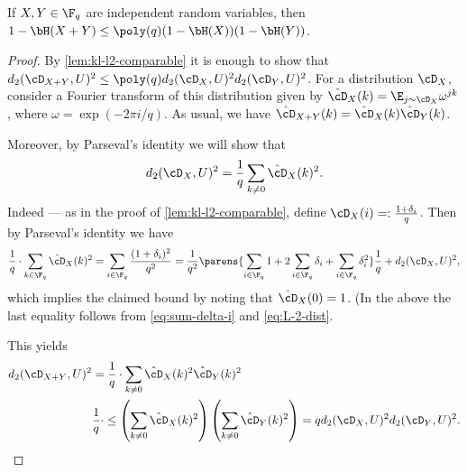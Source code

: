 \documentclass[11pt]{article}
\begin{document}
\begin{lemma}
	\label{lem:entropy-unconditional}
	If $X, Y \in \F_q$ are independent random variables, then $1 - \bH(X + Y) \leq \poly(q) (1 - \bH(X))(1 - \bH(Y))$.
\end{lemma}
\begin{proof}
	By \cref{lem:kl-l2-comparable} it is enough to show that $d_2(\cD_{X+Y}, U)^2 \leq \poly(q) d_2(\cD_X, U)^2 d_2(\cD_Y, U)^2$.
	For a distribution $\cD_X$, consider a Fourier transform of this distribution given by $\hat{\cD}_X(k) = \E_{j \sim \cD_X} \omega^{jk}$, where $\omega = \exp(-2 \pi i/q)$. As usual, we have $\hat{\cD}_{X+Y}(k) = \hat{\cD}_X(k) \hat{\cD}_Y(k)$.
	
	Moreover, by Parseval's identity we will show that 
	\[d_2(\cD_X, U)^2  = \frac{1}{q}\sum_{k \not= 0} \hat{\cD}_X(k)^2.\] 
	Indeed --- as in the proof of \cref{lem:kl-l2-comparable}, define $\cD_X(i) =:  \frac{1 + \delta_i}{q}$. Then by Parseval's identity we have
	\[\frac{1}{q}\cdot\sum_{k\in\F_q} \hat{\cD}_X(k)^2 = \sum_{i\in\F_q} \frac{(1+\delta_i)^2}{q^2} =\frac 1{q^2}\parens{\sum_{i\in\F_q} 1 +2\sum_{i\in \F_q} \delta_i +\sum_{i\in\F_q} \delta_i^2}\frac{1}{q} +d_2(\cD_X, U)^2,\]
	which implies the claimed bound by noting that $\hat{\cD}_X(0)=1$. (In the above the last equality follows from \cref{eq:sum-delta-i} and \cref{eq:L-2-dist}.
	
	This yields
	\begin{align*}
		d_2(\cD_{X+Y}, U)^2 & = \frac 1q\cdot \sum_{k \not= 0} \hat{\cD}_X(k)^2 \hat{\cD}_Y(k)^2  \\
		& \frac 1q \cdot\leq \left(\sum_{k \not=0} \hat{\cD}_X(k)^2\right)\left(\sum_{k\not=0} \hat{\cD}_Y(k)^2\right) = q d_2(\cD_X, U)^2 d_2(\cD_Y, U)^2. \qedhere
	\end{align*}
\end{proof}
\end{document}
